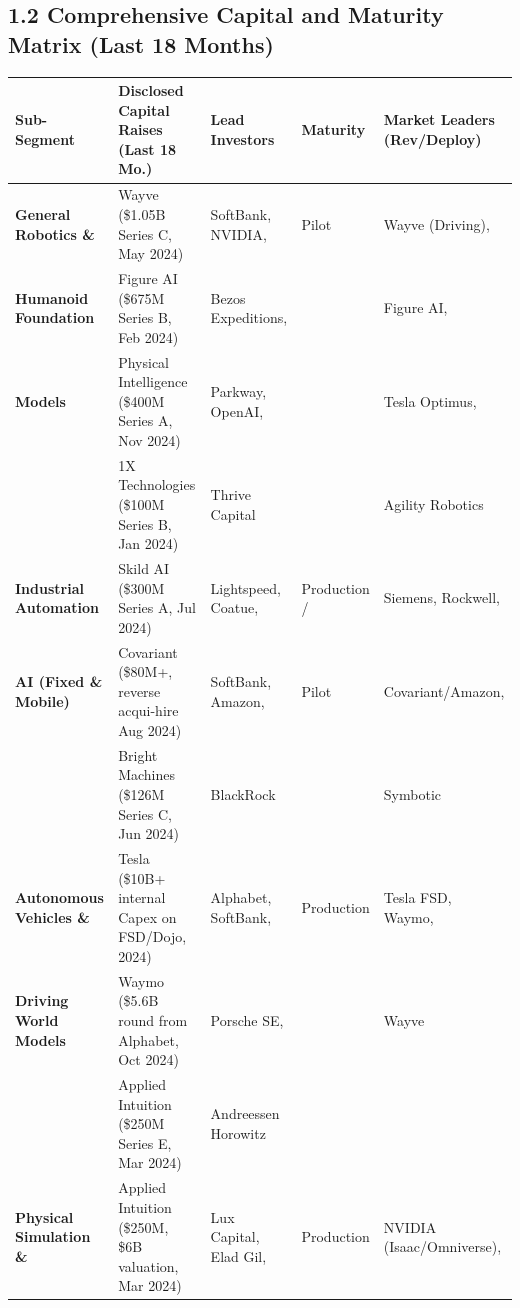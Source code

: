 \documentclass[11pt,a4paper]{article}
\begin{document}
\subsection{1.2 Comprehensive Capital and Maturity Matrix (Last 18 Months)}
\begin{table}[h!]
\centering
\scriptsize
\begin{tabularx}{\textwidth}{@{}l p{4.2cm} p{3.2cm} l X@{}}
\toprule
\textbf{Sub-Segment} & \textbf{Disclosed Capital Raises (Last 18 Mo.)} & \textbf{Lead Investors} & \textbf{Maturity} & \textbf{Market Leaders (Rev/Deploy)} \\
\midrule
\textbf{General Robotics \&} & Wayve (\$1.05B Series C, May 2024)\newline & SoftBank, NVIDIA, & Pilot & Wayve (Driving), \\
\textbf{Humanoid Foundation} & Figure AI (\$675M Series B, Feb 2024)\newline & Bezos Expeditions, & & Figure AI, \\
\textbf{Models} & Physical Intelligence (\$400M Series A, Nov 2024)\newline & Parkway, OpenAI, & & Tesla Optimus, \\
& 1X Technologies (\$100M Series B, Jan 2024) & Thrive Capital & & Agility Robotics \\
\addlinespace
\textbf{Industrial Automation} & Skild AI (\$300M Series A, Jul 2024)\newline & Lightspeed, Coatue, & Production / & Siemens, Rockwell, \\
\textbf{AI (Fixed \& Mobile)} & Covariant (\$80M+, reverse acqui-hire Aug 2024)\newline & SoftBank, Amazon, & Pilot & Covariant/Amazon, \\
& Bright Machines (\$126M Series C, Jun 2024) & BlackRock & & Symbotic \\
\addlinespace
\textbf{Autonomous Vehicles \&} & Tesla (\$10B+ internal Capex on FSD/Dojo, 2024)\newline & Alphabet, SoftBank, & Production & Tesla FSD, Waymo, \\
\textbf{Driving World Models} & Waymo (\$5.6B round from Alphabet, Oct 2024)\newline & Porsche SE, & & Wayve \\
& Applied Intuition (\$250M Series E, Mar 2024) & Andreessen Horowitz & & \\
\addlinespace
\textbf{Physical Simulation \&} & Applied Intuition (\$250M, \$6B valuation, Mar 2024)\newline & Lux Capital, Elad Gil, & Production & NVIDIA (Isaac/Omniverse), \\

\end{tabularx}
\end{table}
\end{document}
